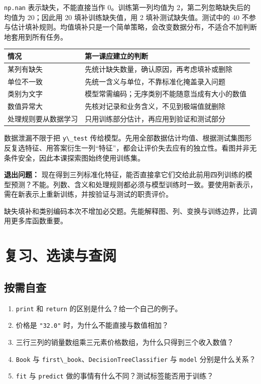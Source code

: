 \documentclass[UTF8,a4paper,11pt,fontset=fandol]{ctexart}
\providecommand{\tightlist}{\setlength{\itemsep}{0pt}\setlength{\parskip}{0pt}}
\providecommand{\passthrough}[1]{#1}
\begin{document}
\passthrough{\lstinline!np.nan!} 表示缺失，不能直接当作 0。训练第一列均值为 2，第二列忽略缺失后的均值为 20；因此用 20 填补训练缺失值，用 2 填补测试缺失值。测试中的 40 不参与估计填补规则。均值填补只是一个简单策略，会改变数据分布，不适合不加判断地套用到所有任务。

\begin{longtable}[]{@{}ll@{}}
\toprule\noalign{}
情况 & 第一课应建立的判断 \\
\midrule\noalign{}
\endhead
\bottomrule\noalign{}
\endlastfoot
某列有缺失 & 先统计缺失数量，确认原因，再考虑填补或删除 \\
单位不一致 & 先统一含义与单位，不靠标准化掩盖录入问题 \\
类别为文字 & 模型常需编码；无序类别不能随意当成有大小的数值 \\
数值异常大 & 先核对记录和业务含义，不见到极端值就删除 \\
处理规则要从数据学习 & 只用训练部分估计，再应用到验证和测试部分 \\
\end{longtable}

数据泄漏不限于把 \passthrough{\lstinline!y\_test!} 传给模型。先用全部数据估计均值、根据测试集图形反复选特征、用答案衍生一列``特征''，都会让评价失去应有的独立性。看图并非无条件安全，因此本课探索图始终使用训练集。

\textbf{退出问题：} 现在得到三列标准化特征，能否直接拿它们交给此前用四列训练的模型预测？不能。列数、含义和处理规则都必须与模型训练时一致。要使用新表示，需在新表示上重新训练，并按验证与测试的职责评价。

缺失填补和类别编码本次不增加必交题。先能解释图、列、变换与训练边界，比调用更多库函数重要。

\clearpage

\section{复习、选读与查阅}\label{ux590dux4e60ux9009ux8bfbux4e0eux67e5ux9605}

\subsection{按需自查}\label{ux6309ux9700ux81eaux67e5}

\begin{enumerate}
\def\labelenumi{\arabic{enumi}.}
\tightlist
\item
  \passthrough{\lstinline!print!} 和 \passthrough{\lstinline!return!} 的区别是什么？给一个自己的例子。
\item
  价格是 \passthrough{\lstinline!"32.0"!} 时，为什么不能直接与数值相加？
\item
  三行三列的销量数组乘三元素价格数组，为什么只得到三个收入数值？
\item
  \passthrough{\lstinline!Book!} 与 \passthrough{\lstinline!first\_book!}、\passthrough{\lstinline!DecisionTreeClassifier!} 与 \passthrough{\lstinline!model!} 分别是什么关系？
\item
  \passthrough{\lstinline!fit!} 与 \passthrough{\lstinline!predict!} 做的事情有什么不同？测试标签能否用于训练？
\end{enumerate}
\end{document}
